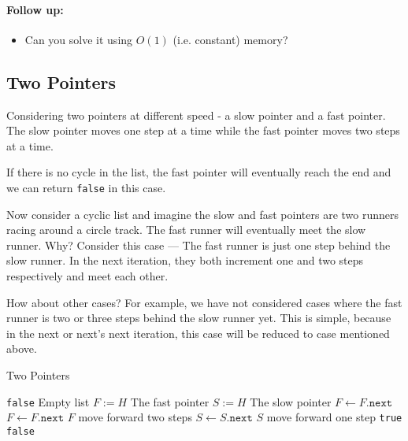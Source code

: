 \paragraph{Follow up:}
\begin{itemize}
\item Can you solve it using $O(1)$ (i.e. constant) memory?
\end{itemize}
\subsection{Two Pointers}
Considering two pointers at different speed - a slow pointer and a fast pointer. The slow pointer moves one step at a time while the fast pointer moves two steps at a time.
\par
If there is no cycle in the list, the fast pointer will eventually reach the end and we can return \texttt{false} in this case.
\par
Now consider a cyclic list and imagine the slow and fast pointers are two runners racing around a circle track. The fast runner will eventually meet the slow runner. Why? Consider this case --- The fast runner is just one step behind the slow runner. In the next iteration, they both increment one and two steps respectively and meet each other.
\par
How about other cases? For example, we have not considered cases where the fast runner is two or three steps behind the slow runner yet. This is simple, because in the next or next's next iteration, this case will be reduced to case mentioned above.
\setcounter{algorithm}{0}
\begin{algorithm}[H]
\caption{Two Pointers}
\begin{algorithmic}[1]
\State \Return \texttt{false} \Comment Empty list
\EndIf
\State $F:=H$ \Comment The fast pointer
\State $S:=H$ \Comment The slow pointer
\State $F\gets F.\texttt{next}$
\State $F\gets F.\texttt{next}$ \Comment $F$ move forward two steps
\State $S\gets S.\texttt{next}$ \Comment $S$ move forward one step
\State \Return \texttt{true}
\EndIf
\EndWhile
\State \Return \texttt{false}
\EndProcedure
\end{algorithmic}
\end{algorithm}